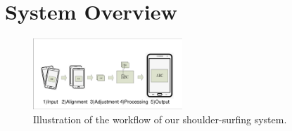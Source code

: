 \section{System Overview}
\label{sec-system-overview} 
\begin{figure}
    \centering
       \includegraphics[width=0.5\textwidth]{./pic/workflow.pdf}
       \caption{Illustration of the workflow of our shoulder-surfing system.}
       \label{fig-workflow}
\end{figure}

